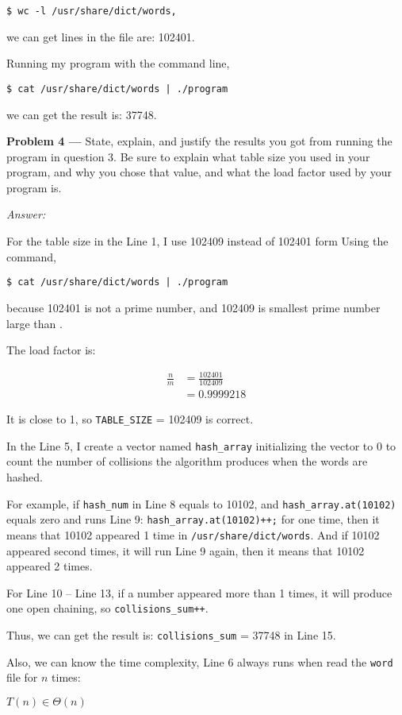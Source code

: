 \documentclass[11pt]{article}
\newcommand{\problem}[1]{\vspace*{2ex}\textbf{Problem #1 ---} }
\newcommand{\answer}{\emph{Answer: } }
\begin{document}
\begin{Verbatim}
$ wc -l /usr/share/dict/words,
\end{Verbatim}

we can get lines in the file are: 102401.

Running my program with the command line,

\begin{Verbatim}
$ cat /usr/share/dict/words | ./program
\end{Verbatim}

we can get the result is: 37748.

\newpage

\problem{4} State, explain, and justify the results you got from running 
the program in question 3. Be sure to explain what table size you used in 
your program, and why you chose that value, and what the load factor used 
by your program is.

\answer{}

For the table size in the Line 1, I use 102409 instead of 102401 form 
Using the command, 

\begin{Verbatim}
$ cat /usr/share/dict/words | ./program
\end{Verbatim}

because 102401 is not a prime number, and 102409 is smallest prime number 
large than .

The load factor is:

\begin{align*}
    \frac{n}{m} &= \frac{102401}{102409} \\
                &= 0.9999218
\end{align*}

It is close to 1, so \texttt{TABLE\_SIZE} = 102409 is correct.

In the Line 5, I create a vector named \texttt{hash\_array}
initializing the vector to 0 to count the number of collisions the 
algorithm produces when the words are hashed.

For example, if \texttt{hash\_num} in Line 8 equals to 10102, and
\texttt{hash\_array.at(10102)} equals zero and runs Line 9: 
\texttt{hash\_array.at(10102)++;} for one time, then it means that
10102 appeared 1 time in \newline \texttt{/usr/share/dict/words}. 
And if 10102 appeared second times, it will run Line 9 again, 
then it means that 10102 appeared 2 times.

For Line 10 -- Line 13, if a number appeared more than
1 times, it will produce one open chaining, so 
\texttt{collisions\_sum++}. 

Thus, we can get the result is: \texttt{collisions\_sum} 
= 37748 in Line 15.

Also, we can know the time complexity, Line 6 always runs when read 
the \texttt{word} file for $n$ times:
\begin{center}
    $T(n) \in \Theta(n)$
\end{center}
\end{document}

